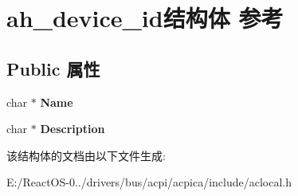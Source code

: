 \hypertarget{structah__device__id}{}\section{ah\+\_\+device\+\_\+id结构体 参考}
\label{structah__device__id}
\subsection*{Public 属性}
\begin{DoxyCompactItemize}
\item 
\mbox{\label{structah__device__id_a311a402591448f9a410fa40c15ac4fc9}} 
char $\ast$ {\bfseries Name}
\item 
\mbox{\label{structah__device__id_adb3564ea0ad461b659ec8ad3e92439c5}} 
char $\ast$ {\bfseries Description}
\end{DoxyCompactItemize}


该结构体的文档由以下文件生成\+:\begin{DoxyCompactItemize}
\item 
E\+:/\+React\+O\+S-\/0../drivers/bus/acpi/acpica/include/aclocal.\+h\end{DoxyCompactItemize}

